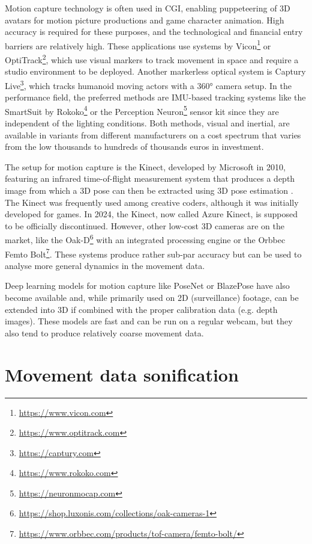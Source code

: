 Motion capture technology is often used in \ac{CGI}, enabling puppeteering of \ac{3D} avatars for motion picture productions and game character animation. High accuracy is required for these purposes, and the technological and financial entry barriers are relatively high. These applications use systems by Vicon\footnote{\url{https://www.vicon.com}} or OptiTrack\footnote{\url{https://www.optitrack.com}}, which use visual markers to track movement in space and require a studio environment to be deployed. Another markerless optical system is Captury Live\footnote{\url{https://captury.com}}, which tracks humanoid moving actors with a 360° camera setup. In the performance field, the preferred methods are IMU-based tracking systems like the SmartSuit by Rokoko\footnote{\url{https://www.rokoko.com}} or the Perception Neuron\footnote{\url{https://neuronmocap.com}} sensor kit since they are independent of the lighting conditions. Both methods, visual and inertial, are available in variants from different manufacturers on a cost spectrum that varies from the low thousands to hundreds of thousands euros in investment.

The  setup for motion capture is the Kinect, developed by Microsoft in 2010, featuring an infrared time-of-flight measurement system that produces a depth image from which a 3D pose can then be extracted using \ac{3D} pose estimation \parencite[see][]{poseEstimationPaper}. The Kinect was frequently used among creative coders, although it was initially developed for games. In 2024, the Kinect, now called Azure Kinect, is supposed to be officially discontinued. However, other low-cost 3D cameras are on the market, like the Oak-D\footnote{\url{https://shop.luxonis.com/collections/oak-cameras-1}} with an integrated processing engine or the Orbbec Femto Bolt\footnote{\url{https://www.orbbec.com/products/tof-camera/femto-bolt/}}. These systems produce rather sub-par accuracy but can be used to analyse more general dynamics in the movement data.

Deep learning models for motion capture like PoseNet \parencite{kendall2016posenet} or BlazePose \parencite{bazarevsky2020blazepose} have also become available and, while primarily used on 2D (surveillance) footage, can be extended into 3D if combined with the proper calibration data (e.g. depth images). These models are fast and can be run on a regular webcam, but they also tend to produce relatively coarse movement data.

\section{Movement data sonification}

